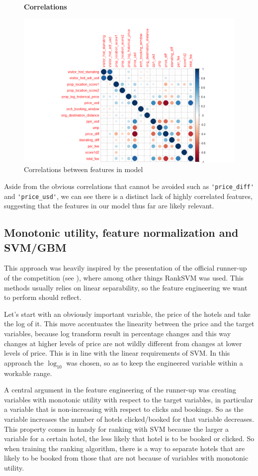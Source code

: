 \documentclass{llncs}
\begin{document}
	\begin{figure}[H]
	\centering
	\textbf{Correlations}\par\medskip
		\includegraphics[scale=0.3]{figures/corr_plot.png}
	\caption{Correlations between features in model}
	\label{fig:corr}
	\end{figure}

Aside from the obvious correlations that cannot be avoided such as \verb!'price_diff'! and \verb!'price_usd'!, we can see there is a distinct lack of highly correlated features, suggesting that the features in our model thus far are likely relevant. 

\subsection{Monotonic utility, feature normalization and SVM/GBM}
This approach was heavily inspired by the presentation of the official runner-up of the competition (see \cite{Wang2013}), where among other things RankSVM was used. This methods usually relies on linear separability, so the feature engineering we want to perform should reflect.

Let's start with an obviously important variable, the price of the hotels and take the log of it. This move accentuates the linearity between the price and the target variables, because log transform result in percentage changes and this way changes at higher levels of price are not wildly different from changes at lower levels of price. This is in line with the linear requirements of SVM. In this approach the $\log_{10}$ was chosen, so as to keep the engineered variable within a workable range.

A central argument in the feature engineering of the runner-up was creating variables with monotonic utility with respect to the target variables, in particular a variable that is non-increasing with respect to clicks and bookings. So as the variable increases the number of hotels clicked/booked for that variable decreases. This property comes in handy for ranking with SVM because the larger a variable for a certain hotel, the less likely that hotel is to be booked or clicked. So when training the ranking algorithm, there is a way to separate hotels that are likely to be booked from those that are not because of variables with monotonic utility.
\end{document}
